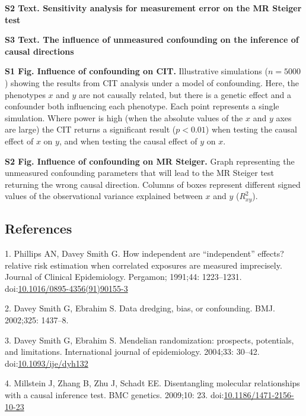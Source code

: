 \documentclass[]{article}
\begin{document}
\textbf{S2 Text. Sensitivity analysis for measurement error on the MR
Steiger test}

\textbf{S3 Text. The influence of unmeasured confounding on the
inference of causal directions}

\textbf{S1 Fig. Influence of confounding on CIT.} Illustrative
simulations (\(n = 5000\)) showing the results from CIT analysis under a
model of confounding. Here, the phenotypes \(x\) and \(y\) are not
causally related, but there is a genetic effect and a confounder both
influencing each phenotype. Each point represents a single simulation.
Where power is high (when the absolute values of the \(x\) and \(y\)
axes are large) the CIT returns a significant result (\(p < 0.01\)) when
testing the causal effect of \(x\) on \(y\), and when testing the causal
effect of \(y\) on \(x\).

\textbf{S2 Fig. Influence of confounding on MR Steiger.} Graph
representing the unmeasured confounding parameters that will lead to the
MR Steiger test returning the wrong causal direction. Columns of boxes
represent different signed values of the observational variance
explained between \(x\) and \(y\) (\(R^2_{xy}\)).

\newpage

\subsection{References}\label{references}

\raggedright

\hypertarget{refs}{}
\hypertarget{ref-Phillips1991}{}
1. Phillips AN, Davey Smith G. How independent are ``independent''
effects? relative risk estimation when correlated exposures are measured
imprecisely. Journal of Clinical Epidemiology. Pergamon; 1991;44:
1223--1231.
doi:\href{https://doi.org/10.1016/0895-4356(91)90155-3}{10.1016/0895-4356(91)90155-3}

\hypertarget{ref-DaveySmith2002}{}
2. Davey Smith G, Ebrahim S. Data dredging, bias, or confounding. BMJ.
2002;325: 1437--8.

\hypertarget{ref-DaveySmith2004}{}
3. Davey Smith G, Ebrahim S. Mendelian randomization: prospects,
potentials, and limitations. International journal of epidemiology.
2004;33: 30--42.
doi:\href{https://doi.org/10.1093/ije/dyh132}{10.1093/ije/dyh132}

\hypertarget{ref-Millstein2009}{}
4. Millstein J, Zhang B, Zhu J, Schadt EE. Disentangling molecular
relationships with a causal inference test. BMC genetics. 2009;10: 23.
doi:\href{https://doi.org/10.1186/1471-2156-10-23}{10.1186/1471-2156-10-23}
\end{document}
